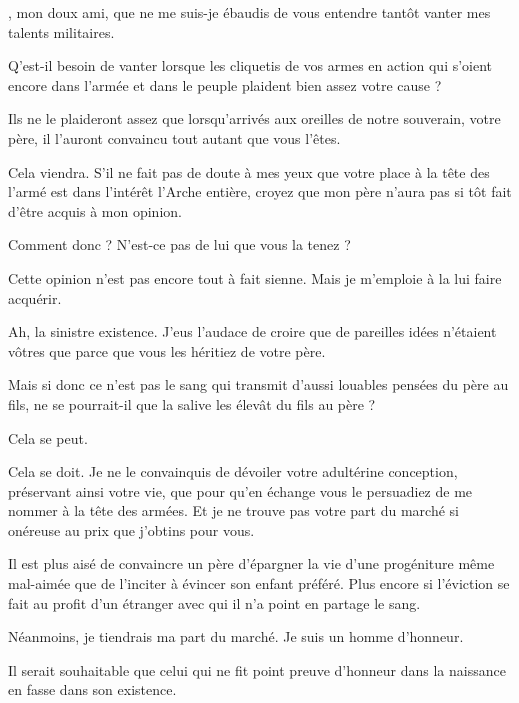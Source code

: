 \begin{drama}
  \generalspeaks \elena, mon doux ami, que ne me suis-je ébaudis de vous entendre tantôt vanter mes talents militaires.

  \elenaspeaks Q’est-il besoin de vanter lorsque les cliquetis de vos armes en action qui s’oient encore dans l’armée et dans le peuple plaident bien assez votre cause ?

  \generalspeaks Ils  ne le plaideront assez que lorsqu’arrivés aux oreilles de notre souverain, votre père, il l’auront convaincu tout autant que vous l’êtes.

  \elenaspeaks Cela viendra. S’il ne fait pas de doute à mes yeux que votre place à la tête des l’armé est dans l’intérêt l’Arche entière, croyez que mon père n’aura pas si tôt fait d’être acquis à mon opinion.

  \generalspeaks Comment donc ? N’est-ce pas de lui que vous la tenez ?


  \elenaspeaks Cette opinion n’est pas encore tout à fait sienne. Mais je m’emploie à la lui faire acquérir.

  \generalspeaks 
  Ah, la sinistre existence. J’eus l’audace de croire que de pareilles idées n’étaient vôtres que parce que vous les héritiez de votre père.

  Mais si donc ce n’est pas le sang qui transmit d’aussi louables pensées du père au fils, ne se pourrait-il que la salive les élevât du fils au père ?

  \elenaspeaks Cela se peut.

  \generalspeaks Cela se doit. Je ne le convainquis de dévoiler votre adultérine conception, préservant ainsi votre vie, que pour qu’en échange vous le persuadiez de me nommer à la tête des armées. Et je ne trouve pas votre part du marché si onéreuse au prix que j’obtins pour vous.

  \elenaspeaks
  Il est plus aisé de convaincre un père d’épargner la vie d’une progéniture même mal-aimée que de l’inciter à évincer son enfant préféré. Plus encore si l’éviction se fait au profit d’un étranger avec qui il n’a point en partage le sang.

  Néanmoins, je tiendrais ma part du marché. Je suis un homme d’honneur.

  \generalspeaks Il serait souhaitable que celui qui ne fit point preuve d’honneur dans la naissance en fasse dans son existence.

\end{drama}

